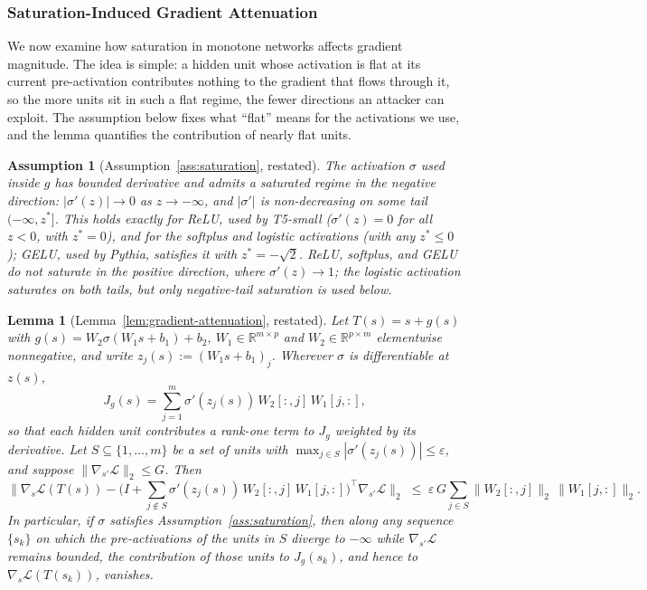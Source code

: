 \documentclass{article}
\theoremstyle{plain}
\theoremstyle{definition}
\theoremstyle{remark}
\theoremstyle{plain}
\newtheorem*{lemmastar}{Lemma}
\newtheorem*{assumptionstar}{Assumption}
\begin{document}
\subsubsection{Saturation-Induced Gradient Attenuation}
We now examine how saturation in monotone networks affects gradient magnitude. The idea is simple: a hidden unit whose activation is flat at its current pre-activation contributes nothing to the gradient that flows through it, so the more units sit in such a flat regime, the fewer directions an attacker can exploit. The assumption below fixes what ``flat'' means for the activations we use, and the lemma quantifies the contribution of nearly flat units.
\begin{assumptionstar}[Assumption~\ref{ass:saturation}, restated]
The activation $\sigma$ used inside $g$ has bounded derivative and admits a
saturated regime in the negative direction: $|\sigma'(z)| \to 0$ as $z\to -\infty$,
and $|\sigma'|$ is non-decreasing on some tail $(-\infty, z^\ast]$. This holds exactly
for ReLU, used by T5-small ($\sigma'(z) = 0$ for all $z < 0$, with $z^\ast = 0$), and
for the softplus and logistic activations (with any $z^\ast \le 0$); GELU, used by Pythia,
satisfies it with $z^\ast = -\sqrt{2}$. ReLU, softplus, and GELU do not saturate in the positive direction, where
$\sigma'(z) \to 1$; the logistic activation saturates on both tails, but only
negative-tail saturation is used below.
\end{assumptionstar}



\begin{lemmastar}[Lemma~\ref{lem:gradient-attenuation}, restated]
Let $T(s)=s+g(s)$ with $g(s)=W_2\sigma(W_1 s+b_1)+b_2$, $W_1\in\mathbb{R}^{m\times p}$
and $W_2\in\mathbb{R}^{p\times m}$ elementwise nonnegative, and write
$z_j(s) := (W_1 s + b_1)_j$. Wherever $\sigma$ is differentiable at $z(s)$,
\[
J_g(s) = \sum_{j=1}^{m} \sigma'(z_j(s))\, W_2[:,j]\, W_1[j,:],
\]
so that each hidden unit contributes a rank-one term to $J_g$ weighted by its
derivative. Let $S \subseteq \{1,\dots,m\}$ be a set of units with
$\max_{j\in S} |\sigma'(z_j(s))| \le \varepsilon$, and suppose
$\|\nabla_{s'}\mathcal{L}\|_2 \le G$. Then
\[
\Big\| \nabla_s \mathcal{L}(T(s)) - \Big( I + \sum_{j\notin S} \sigma'(z_j(s))\, W_2[:,j]\, W_1[j,:] \Big)^{\!\top} \nabla_{s'}\mathcal{L} \Big\|_2
\;\le\; \varepsilon\, G \sum_{j\in S} \|W_2[:,j]\|_2\, \|W_1[j,:]\|_2 .
\]
In particular, if $\sigma$ satisfies Assumption~\ref{ass:saturation}, then along any
sequence $\{s_k\}$ on which the pre-activations of the units in $S$ diverge to
$-\infty$ while $\nabla_{s'}\mathcal{L}$ remains bounded,
the contribution of those units to $J_g(s_k)$, and hence to
$\nabla_s \mathcal{L}(T(s_k))$, vanishes.
\end{lemmastar}
\end{document}
